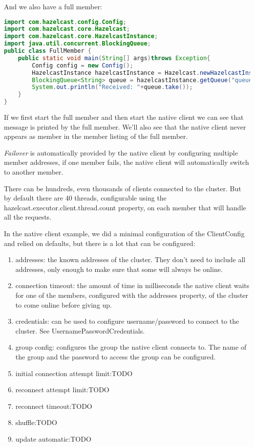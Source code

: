 And we also have a full member:
\begin{lstlisting}[language=java]
import com.hazelcast.config.Config;
import com.hazelcast.core.Hazelcast;
import com.hazelcast.core.HazelcastInstance;
import java.util.concurrent.BlockingQueue;
public class FullMember {
    public static void main(String[] args)throws Exception{
        Config config = new Config();
        HazelcastInstance hazelcastInstance = Hazelcast.newHazelcastInstance(config);
        BlockingQueue<String> queue = hazelcastInstance.getQueue("queue");
        System.out.println("Received: "+queue.take());       
    }
}
\end{lstlisting}
If we first start the full member and then start the native client we can see that message is printed by the full member. We'll also see that the native client never appears as member in the member listing of the full member.	
 
\emph{Failover} is automatically provided by the native client by configuring multiple member addresses, if one member fails, the native client will automatically switch to another member.

There can be hundreds, even thousands of clients connected to the cluster. But by default there are 40 threads, configurable using the hazelcast.executor.client.thread.count property, on each member that will handle all the requests. 

In the native client example, we did a minimal configuration of the ClientConfig and relied on defaults, but there is a lot that can be configured:
\begin{enumerate}
\item addresses: the known addresses of the cluster. They don't need to include all addresses, only enough to make sure that some will always be online.
\item connection timeout: the amount of time in milliseconds the native client waits for one of the members, configured with the addresses property, of the cluster to come online before giving up.
\item credentials: can be used to configure username/password to connect to the cluster. See UsernamePasswordCredentials.
\item group config: configures the group the native client connects to. The name of the group and the password to access the group can be configured.
\item initial connection attempt limit:TODO
\item reconnect attempt limit:TODO
\item reconnect timeout:TODO
\item shuffle:TODO
\item update automatic:TODO
\end{enumerate}

